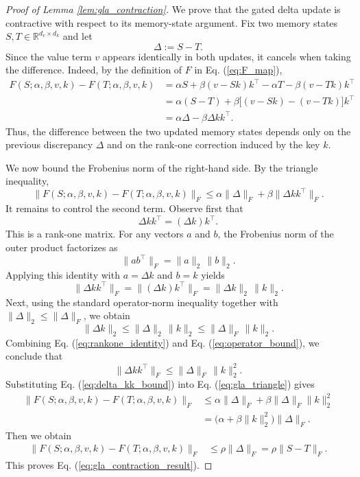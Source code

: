 \documentclass{llmxive}
\begin{document}
\begin{proof}[Proof of Lemma \ref{lem:gla_contraction}]
We prove that the gated delta update is contractive with respect to its memory-state argument.
Fix two memory states $S,T \in \mathbb R^{d_v\times d_k}$ and let
\[
\Delta := S-T.
\]
Since the value term $v$ appears identically in both updates, it cancels when taking the difference.
Indeed, by the definition of $F$ in Eq. (\ref{eq:F_map}),
\begin{align}
F(S;\alpha,\beta,v,k)-F(T;\alpha,\beta,v,k)
&=
\alpha S + \beta (v-Sk)k^\top
-\alpha T - \beta (v-Tk)k^\top
\nonumber\\
&=
\alpha(S-T)+\beta\bigl[(v-Sk)-(v-Tk)\bigr]k^\top
\nonumber\\
&=
\alpha\Delta-\beta\Delta kk^\top.
\label{eq:gla_diff_expand}
\end{align}
Thus, the difference between the two updated memory states depends only on the previous discrepancy
$\Delta$ and on the rank-one correction induced by the key $k$.

We now bound the Frobenius norm of the right-hand side. By the triangle inequality,
\begin{equation}
\|F(S;\alpha,\beta,v,k)-F(T;\alpha,\beta,v,k)\|_F
\le
\alpha\|\Delta\|_F+\beta\|\Delta kk^\top\|_F.
\label{eq:gla_triangle}
\end{equation}
It remains to control the second term. Observe first that
\[
\Delta kk^\top = (\Delta k)k^\top.
\]
This is a rank-one matrix. For any vectors $a$ and $b$, the Frobenius norm of the outer product
factorizes as
\[
\|ab^\top\|_F = \|a\|_2\,\|b\|_2.
\]
Applying this identity with $a=\Delta k$ and $b=k$ yields
\begin{equation}
\|\Delta kk^\top\|_F
=
\|(\Delta k)k^\top\|_F
=
\|\Delta k\|_2\,\|k\|_2.
\label{eq:rankone_identity}
\end{equation}
Next, using the standard operator-norm inequality together with
$\|\Delta\|_2 \le \|\Delta\|_F$, we obtain
\begin{equation}
\|\Delta k\|_2
\le
\|\Delta\|_2\,\|k\|_2
\le
\|\Delta\|_F\,\|k\|_2.
\label{eq:operator_bound}
\end{equation}
Combining Eq. (\ref{eq:rankone_identity}) and Eq. (\ref{eq:operator_bound}), we conclude that
\begin{equation}
\|\Delta kk^\top\|_F
\le
\|\Delta\|_F\,\|k\|_2^2.
\label{eq:delta_kk_bound}
\end{equation}
Substituting Eq. (\ref{eq:delta_kk_bound}) into Eq. (\ref{eq:gla_triangle}) gives
\begin{align}
\|F(S;\alpha,\beta,v,k)-F(T;\alpha,\beta,v,k)\|_F
&\le
\alpha\|\Delta\|_F+\beta\|\Delta\|_F\|k\|_2^2
\nonumber\\
&=
\bigl(\alpha+\beta\|k\|_2^2\bigr)\|\Delta\|_F.
\end{align}
Then we obtain
\begin{align}
\|F(S;\alpha,\beta,v,k)-F(T;\alpha,\beta,v,k)\|_F
&\le
\rho\|\Delta\|_F
=
\rho\|S-T\|_F.
\end{align}
This proves Eq. (\ref{eq:gla_contraction_result}).
\end{proof}
\end{document}

